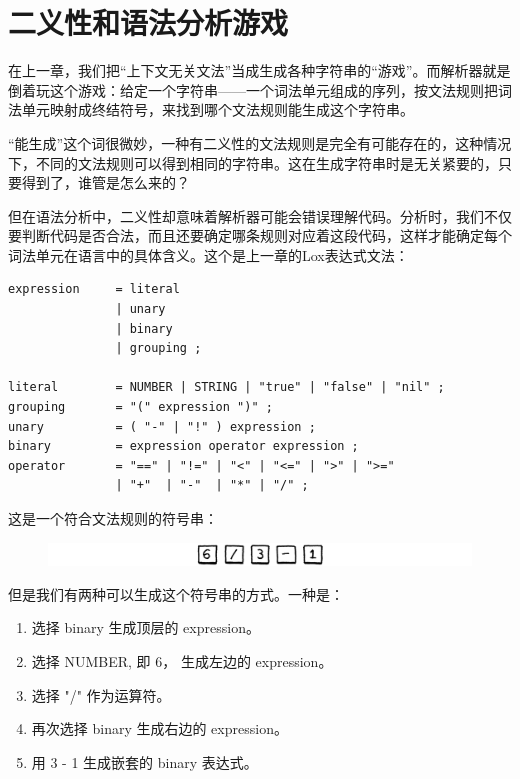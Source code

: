 \documentclass[cn,10pt,math=newtx,citestyle=gb7714-2015,bibstyle=gb7714-2015]{elegantbook}
\begin{document}
\section{二义性和语法分析游戏}

在上一章，我们把“上下文无关文法”当成生成各种字符串的“游戏”。而解析器就是倒着玩这个游戏：给定一个字符串——一个词法单元组成的序列，按文法规则把词法单元映射成终结符号，来找到哪个文法规则能生成这个字符串。

“能生成”这个词很微妙，一种有二义性的文法规则是完全有可能存在的，这种情况下，不同的文法规则可以得到相同的字符串。这在生成字符串时是无关紧要的，只要得到了，谁管是怎么来的？

但在语法分析中，二义性却意味着解析器可能会错误理解代码。分析时，我们不仅要判断代码是否合法，而且还要确定哪条规则对应着这段代码，这样才能确定每个词法单元在语言中的具体含义。这个是上一章的Lox表达式文法：

\begin{verbatim}
expression     = literal
               | unary
               | binary
               | grouping ;

literal        = NUMBER | STRING | "true" | "false" | "nil" ;
grouping       = "(" expression ")" ;
unary          = ( "-" | "!" ) expression ;
binary         = expression operator expression ;
operator       = "==" | "!=" | "<" | "<=" | ">" | ">="
               | "+"  | "-"  | "*" | "/" ;
\end{verbatim}

这是一个符合文法规则的符号串：

\begin{figure}[h]
\centering
\includegraphics[width=\textwidth]{image/parsing-expressions/tokens.png}
\end{figure}

但是我们有两种可以生成这个符号串的方式。一种是：

\begin{enumerate}
  \item 选择 binary 生成顶层的 expression。
  \item 选择 NUMBER, 即 6， 生成左边的 expression。
  \item 选择 "/" 作为运算符。
  \item 再次选择 binary 生成右边的 expression。
  \item 用 3 - 1 生成嵌套的 binary 表达式。
\end{enumerate}
\end{document}
